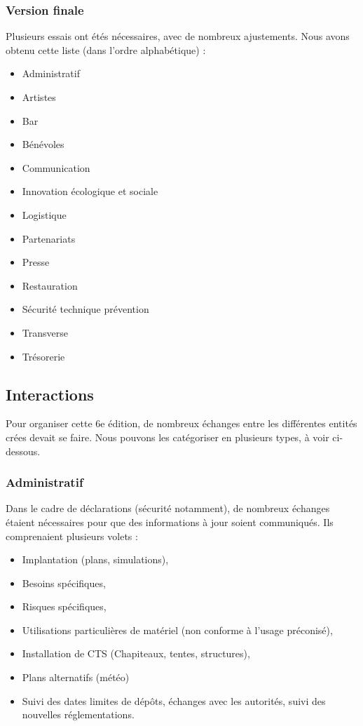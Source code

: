 \documentclass[12pt,a4paper]{report}
\begin{document}
\subsubsection{Version finale}
Plusieurs essais ont étés nécessaires, avec de nombreux ajustements. Nous avons obtenu cette liste (dans l'ordre alphabétique) : 
\begin{itemize}
\item Administratif
\item Artistes
\item Bar
\item Bénévoles
\item Communication
\item Innovation écologique et sociale
\item Logistique
\item Partenariats
\item Presse
\item Restauration
\item Sécurité technique prévention
\item Transverse
\item Trésorerie
\end{itemize}

\subsection{Interactions}
Pour organiser cette 6e édition, de nombreux échanges entre les différentes entités crées devait se faire. Nous pouvons les catégoriser en plusieurs types, à voir ci-dessous.
\subsubsection{Administratif}
Dans le cadre de déclarations (sécurité notamment), de nombreux échanges étaient nécessaires pour que des informations à jour soient communiqués. Ils comprenaient plusieurs volets :
\begin{itemize}
\item Implantation (plans, simulations),
\item Besoins spécifiques,
\item Risques spécifiques,
\item Utilisations particulières de matériel (non conforme à l'usage préconisé),
\item Installation de CTS (Chapiteaux, tentes, structures),
\item Plans alternatifs (météo)
\item Suivi des dates limites de dépôts, échanges avec les autorités, suivi des nouvelles réglementations.
\end{itemize}
\end{document}
